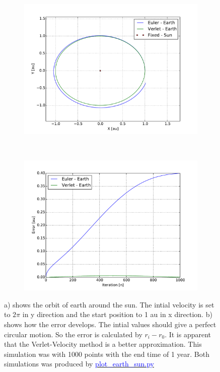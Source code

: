 \begin{figure}[H]
    \centering
    \begin{subfigure}{0.5\textwidth}
        \centering
        \includegraphics[width=\linewidth]{result/bilder/earth-sun.pdf}
    	\caption{}
    \end{subfigure}%
    ~ 
    \begin{subfigure}{0.5\textwidth}
        \centering
        \includegraphics[width=\linewidth]{result/bilder/earth-sun-error.pdf}
        \caption{}
    \end{subfigure}
    \caption{a) shows the orbit of earth around the sun. The intial velocity is set to $2\pi$ in y direction and the start position to 1 au in x direction. b) shows how the error develops. The intial values should give a perfect circular motion. So the error is calculated by $r_i - r_{0}$. It is apparent that the Verlet-Velocity method is a better approximation. This simulation was with 1000 points with the end time of 1 year. Both simulations was produced by \href{https://github.com/erikfsk/Project-3/tree/master/Project3/earth-sun-standard-results}{\textcolor{blue}{plot\_earth\_sun.py}}}
    \label{fig:earth-sun}
\end{figure}
